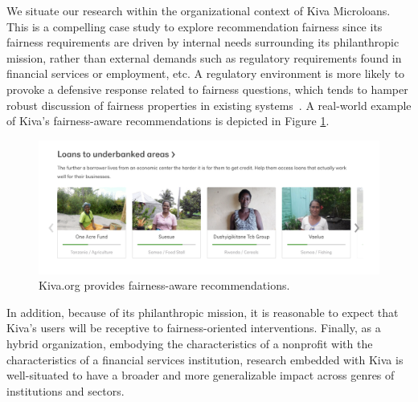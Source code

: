         We situate our research within the organizational context of Kiva Microloans. This is a compelling case study to explore recommendation fairness since its fairness requirements are driven by internal needs surrounding its philanthropic mission, rather than external demands such as regulatory requirements found in financial services or employment, etc. A regulatory environment is more likely to provoke a defensive response related to fairness questions, which tends to hamper robust discussion of fairness properties in existing systems~\cite{chen2018fair,holstein2019improving}. A real-world example of Kiva's fairness-aware recommendations is depicted in Figure \ref{fig:kiva_underbanked}.
        
        
        \begin{figure}[htb]
        \includegraphics[width=0.98\columnwidth]{imgs/far/underbanked_areas.png}
        \caption{Kiva.org provides fairness-aware recommendations.}
        \label{fig:kiva_underbanked}
        \end{figure}
        
        In addition, because of its philanthropic mission, it is reasonable to expect that Kiva's users will be receptive to fairness-oriented interventions. Finally, as a hybrid organization, embodying the characteristics of a nonprofit with the characteristics of a financial services institution, research embedded with Kiva is well-situated to have a broader and more generalizable impact across genres of institutions and sectors.
    
    

